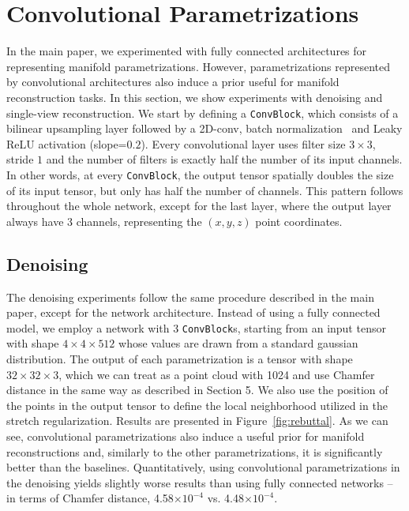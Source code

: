 \appendix
\section{Convolutional Parametrizations}

In the main paper, we experimented with fully connected architectures
for representing manifold parametrizations.
However, parametrizations represented by convolutional architectures
also induce a prior useful for manifold reconstruction tasks.
In this section, we show experiments with denoising and single-view
reconstruction.
We start by defining a \texttt{ConvBlock}, which consists of a bilinear upsampling layer followed by a 2D-conv, batch normalization~\cite{batchnorm} and Leaky ReLU activation (slope=$0.2$).
Every convolutional layer uses filter size $3 \times 3$, stride $1$ and the number of filters is exactly half the number of its input channels.
In other words, at every \texttt{ConvBlock}, the output tensor spatially doubles the size of its input tensor, but only has half the number of channels.
This pattern follows throughout the whole network, except for the last layer, where the output layer always have 3 channels, representing the $(x,y,z)$ point coordinates.

\subsection{Denoising}

The denoising experiments follow the same procedure described in the
main paper, except for the network architecture.
Instead of using a fully connected model, we employ a network with 3 \texttt{ConvBlock}s,
starting from an input tensor with shape $4\times4\times512$ whose values are drawn from
a standard gaussian distribution.
The output of each parametrization is a tensor with shape $32\times32\times3$, which we can treat
as a point cloud with 1024 and use Chamfer distance in the same way as described in Section 5.
We also use the position of the points in the output tensor to define the local neighborhood
utilized in the stretch regularization.
Results are presented in Figure~\ref{fig:rebuttal}.
As we can see, convolutional parametrizations also induce a useful prior for manifold
reconstructions and, similarly to the other parametrizations, it is significantly
better than the baselines.
Quantitatively, using convolutional parametrizations in the denoising yields slightly
worse results than using fully connected networks -- in terms of Chamfer distance, 4.58$\times10^{-4}$ vs. 4.48$\times10^{-4}$.


